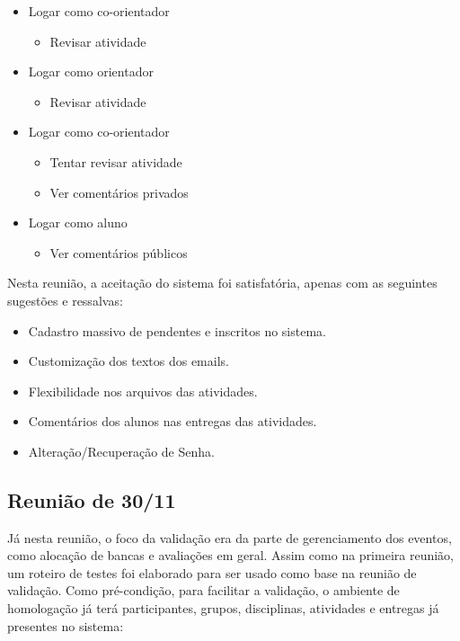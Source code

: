 \begin{itemize}
    \item Logar como co-orientador
    \begin{itemize}
        \item Revisar atividade
    \end{itemize}

    \item Logar como orientador
    \begin{itemize}
        \item Revisar atividade
    \end{itemize}

    \item Logar como co-orientador
    \begin{itemize}
        \item Tentar revisar atividade
        \item Ver comentários privados
    \end{itemize}
    
    \item Logar como aluno
    \begin{itemize}
        \item Ver comentários públicos
    \end{itemize}
\end{itemize}

Nesta reunião, a aceitação do sistema foi satisfatória, apenas com as seguintes sugestões e ressalvas:

\begin{itemize}
    \item Cadastro massivo de pendentes e inscritos no sistema.
    \item Customização dos textos dos emails.
    \item Flexibilidade nos arquivos das atividades.
    \item Comentários dos alunos nas entregas das atividades.
    \item Alteração/Recuperação de Senha.
\end{itemize}

\subsection{Reunião de 30/11}

Já nesta reunião, o foco da validação era da parte de gerenciamento dos eventos, como alocação de bancas e avaliações em geral. Assim como na primeira reunião, um roteiro de testes foi elaborado para ser usado como base na reunião de validação. Como pré-condição, para facilitar a validação, o ambiente de homologação já terá participantes, grupos, disciplinas, atividades e entregas já presentes no sistema:

